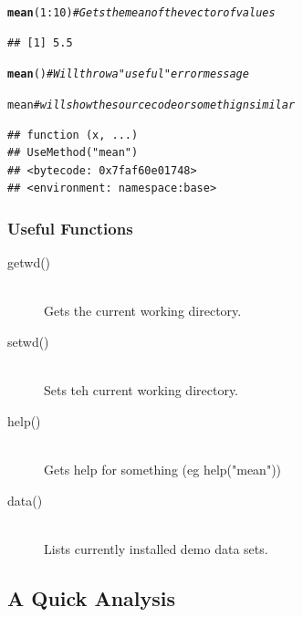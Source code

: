 \documentclass[draft]{article}\usepackage[]{graphicx}\usepackage[]{color}
\makeatletter
\newcommand{\hlnum}[1]{\textcolor[rgb]{0.686,0.059,0.569}{#1}}%
\newcommand{\hlcom}[1]{\textcolor[rgb]{0.678,0.584,0.686}{\textit{#1}}}%
\newcommand{\hlopt}[1]{\textcolor[rgb]{0,0,0}{#1}}%
\newcommand{\hlstd}[1]{\textcolor[rgb]{0.345,0.345,0.345}{#1}}%
\newcommand{\hlkwd}[1]{\textcolor[rgb]{0.737,0.353,0.396}{\textbf{#1}}}%
\newenvironment{kframe}{%
 \def\at@end@of@kframe{}%
 \ifinner\ifhmode%
  \def\at@end@of@kframe{\end{minipage}}%
  \begin{minipage}{\columnwidth}%
 \fi\fi%
 \def\FrameCommand##1{\hskip\@totalleftmargin \hskip-\fboxsep
 \colorbox{shadecolor}{##1}\hskip-\fboxsep
     \hskip-\linewidth \hskip-\@totalleftmargin \hskip\columnwidth}%
 \MakeFramed {\advance\hsize-\width
   \@totalleftmargin\z@ \linewidth\hsize
   \@setminipage}}%
 {\par\unskip\endMakeFramed%
 \at@end@of@kframe}
\newenvironment{knitrout}{}{} %
\makeatother
\begin{document}
\begin{knitrout}
\color{fgcolor}\begin{kframe}
\begin{alltt}
    \hlkwd{mean}\hlstd{(}\hlnum{1}\hlopt{:}\hlnum{10}\hlstd{)} \hlcom{# Gets the mean of the vector of values}
\end{alltt}
\begin{verbatim}
## [1] 5.5
\end{verbatim}
\begin{alltt}
    \hlkwd{mean}\hlstd{()} \hlcom{# Will throw a "useful" error message}
\end{alltt}


{\ttfamily\noindent\bfseries{}}\begin{alltt}
    \hlstd{mean} \hlcom{# will show the source code or somethign similar}
\end{alltt}
\begin{verbatim}
## function (x, ...) 
## UseMethod("mean")
## <bytecode: 0x7faf60e01748>
## <environment: namespace:base>
\end{verbatim}
\end{kframe}
\end{knitrout}
  
  \subsubsection*{Useful Functions}
    \begin{description}
      \item[getwd()] \hfill \\
      Gets the current working directory.
      \item[setwd()] \hfill \\
      Sets teh current working directory.
      \item[help()] \hfill \\
      Gets help for something (eg help("mean"))
      \item[data()] \hfill \\
      Lists currently installed demo data sets.
    \end{description}
  
  \subsection*{A Quick Analysis}
  
\end{document}
